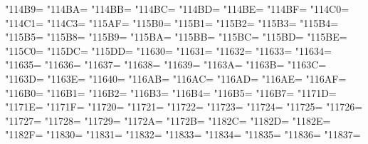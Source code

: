 \XeTeXcharclass"114B9=\KclassCM
\XeTeXcharclass"114BA=\KclassCM
\XeTeXcharclass"114BB=\KclassCM
\XeTeXcharclass"114BC=\KclassCM
\XeTeXcharclass"114BD=\KclassCM
\XeTeXcharclass"114BE=\KclassCM
\XeTeXcharclass"114BF=\KclassCM
\XeTeXcharclass"114C0=\KclassCM
\XeTeXcharclass"114C1=\KclassCM
\XeTeXcharclass"114C3=\KclassCM
\XeTeXcharclass"115AF=\KclassCM
\XeTeXcharclass"115B0=\KclassCM
\XeTeXcharclass"115B1=\KclassCM
\XeTeXcharclass"115B2=\KclassCM
\XeTeXcharclass"115B3=\KclassCM
\XeTeXcharclass"115B4=\KclassCM
\XeTeXcharclass"115B5=\KclassCM
\XeTeXcharclass"115B8=\KclassCM
\XeTeXcharclass"115B9=\KclassCM
\XeTeXcharclass"115BA=\KclassCM
\XeTeXcharclass"115BB=\KclassCM
\XeTeXcharclass"115BC=\KclassCM
\XeTeXcharclass"115BD=\KclassCM
\XeTeXcharclass"115BE=\KclassCM
\XeTeXcharclass"115C0=\KclassCM
\XeTeXcharclass"115DC=\KclassCM
\XeTeXcharclass"115DD=\KclassCM
\XeTeXcharclass"11630=\KclassCM
\XeTeXcharclass"11631=\KclassCM
\XeTeXcharclass"11632=\KclassCM
\XeTeXcharclass"11633=\KclassCM
\XeTeXcharclass"11634=\KclassCM
\XeTeXcharclass"11635=\KclassCM
\XeTeXcharclass"11636=\KclassCM
\XeTeXcharclass"11637=\KclassCM
\XeTeXcharclass"11638=\KclassCM
\XeTeXcharclass"11639=\KclassCM
\XeTeXcharclass"1163A=\KclassCM
\XeTeXcharclass"1163B=\KclassCM
\XeTeXcharclass"1163C=\KclassCM
\XeTeXcharclass"1163D=\KclassCM
\XeTeXcharclass"1163E=\KclassCM
\XeTeXcharclass"11640=\KclassCM
\XeTeXcharclass"116AB=\KclassCM
\XeTeXcharclass"116AC=\KclassCM
\XeTeXcharclass"116AD=\KclassCM
\XeTeXcharclass"116AE=\KclassCM
\XeTeXcharclass"116AF=\KclassCM
\XeTeXcharclass"116B0=\KclassCM
\XeTeXcharclass"116B1=\KclassCM
\XeTeXcharclass"116B2=\KclassCM
\XeTeXcharclass"116B3=\KclassCM
\XeTeXcharclass"116B4=\KclassCM
\XeTeXcharclass"116B5=\KclassCM
\XeTeXcharclass"116B7=\KclassCM
\XeTeXcharclass"1171D=\KclassCM
\XeTeXcharclass"1171E=\KclassCM
\XeTeXcharclass"1171F=\KclassCM
\XeTeXcharclass"11720=\KclassCM
\XeTeXcharclass"11721=\KclassCM
\XeTeXcharclass"11722=\KclassCM
\XeTeXcharclass"11723=\KclassCM
\XeTeXcharclass"11724=\KclassCM
\XeTeXcharclass"11725=\KclassCM
\XeTeXcharclass"11726=\KclassCM
\XeTeXcharclass"11727=\KclassCM
\XeTeXcharclass"11728=\KclassCM
\XeTeXcharclass"11729=\KclassCM
\XeTeXcharclass"1172A=\KclassCM
\XeTeXcharclass"1172B=\KclassCM
\XeTeXcharclass"1182C=\KclassCM
\XeTeXcharclass"1182D=\KclassCM
\XeTeXcharclass"1182E=\KclassCM
\XeTeXcharclass"1182F=\KclassCM
\XeTeXcharclass"11830=\KclassCM
\XeTeXcharclass"11831=\KclassCM
\XeTeXcharclass"11832=\KclassCM
\XeTeXcharclass"11833=\KclassCM
\XeTeXcharclass"11834=\KclassCM
\XeTeXcharclass"11835=\KclassCM
\XeTeXcharclass"11836=\KclassCM
\XeTeXcharclass"11837=\KclassCM
